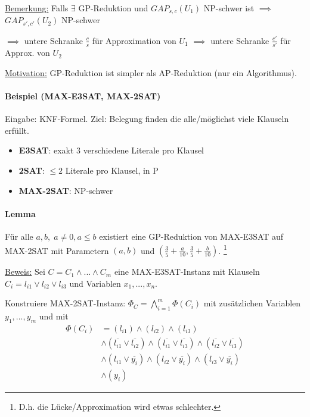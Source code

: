 \underline{Bemerkung:}
Falls $\exists$ GP-Reduktion und $GAP_{s,c}(U_1)$ NP-schwer ist $\implies$ $GAP_{s',c'}(U_2)$ NP-schwer

$\implies$ untere Schranke $\frac{c}{s}$ für Approximation von $U_1$ $\implies$ untere Schranke
$\frac{c'}{s'}$ für Approx. von $U_2$

\underline{Motivation:} GP-Reduktion ist simpler als AP-Reduktion (nur ein Algorithmus).

\paragraph{Beispiel (MAX-E3SAT, MAX-2SAT)}
Eingabe: KNF-Formel. Ziel: Belegung finden die alle/möglichst viele Klauseln erfüllt.
\begin{itemize}
    \item \textbf{E3SAT}: exakt 3 verschiedene Literale pro Klausel
    \item \textbf{2SAT}: $\leq 2$ Literale pro Klausel, in P
    \item \textbf{MAX-2SAT}: NP-schwer
\end{itemize}

\paragraph{Lemma}
Für alle $a,b, \; a \neq 0, a \leq b$ existiert eine GP-Reduktion von MAX-E3SAT auf MAX-2SAT
mit Parametern $(a,b)$ und $\left( \frac{3}{5} + \frac{a}{10} , \frac{3}{5} + \frac{b}{10} \right)$.
\footnote{D.h. die Lücke/Approximation wird etwas schlechter.}

\underline{Beweis:}
Sei $C = C_1 \wedge ... \wedge C_m$ eine MAX-E3SAT-Instanz mit Klauseln
$C_i = l_{i1} \vee l_{i2} \vee l_{i3}$ und Variablen $x_1, ..., x_n$.

Konstruiere MAX-2SAT-Instanz: $\Phi_C = \bigwedge_{i=1}^m \Phi(C_i)$ mit zusätzlichen Variablen
$y_1, ..., y_m$ und mit
\begin{align*}
\Phi(C_i) &= (l_{i1}) \wedge (l_{i2}) \wedge (l_{i3}) \\
    & \wedge (\overline{l_{i1}} \vee \overline{l_{i2}}) \wedge (\overline{l_{i1}} \vee \overline{l_{i3}}) \wedge (\overline{l_{i2}} \vee \overline{l_{i3}}) \\
    & \wedge (l_{i1} \vee \overline{y_i}) \wedge (l_{i2} \vee \overline{y_i}) \wedge (l_{i3} \vee \overline{y_i}) \\
    & \wedge (y_i)
\end{align*}

